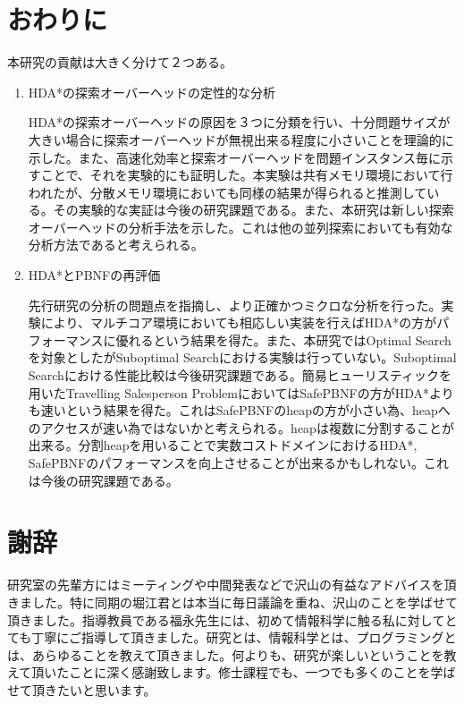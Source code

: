\documentclass[uplatex]{jsarticle}
\begin{document}
\section{おわりに}
\label{sec:conclusion}

本研究の貢献は大きく分けて２つある。

\begin{enumerate}
\item HDA*の探索オーバーヘッドの定性的な分析

HDA*の探索オーバーヘッドの原因を３つに分類を行い、十分問題サイズが大きい場合に探索オーバーヘッドが無視出来る程度に小さいことを理論的に示した。また、高速化効率と探索オーバーヘッドを問題インスタンス毎に示すことで、それを実験的にも証明した。本実験は共有メモリ環境において行われたが、分散メモリ環境においても同様の結果が得られると推測している。その実験的な実証は今後の研究課題である。また、本研究は新しい探索オーバーヘッドの分析手法を示した。これは他の並列探索においても有効な分析方法であると考えられる。
\newline

\item HDA*とPBNFの再評価

先行研究の分析の問題点を指摘し、より正確かつミクロな分析を行った。実験により、マルチコア環境においても相応しい実装を行えばHDA*の方がパフォーマンスに優れるという結果を得た。また、本研究ではOptimal Searchを対象としたがSuboptimal Searchにおける実験は行っていない。Suboptimal Searchにおける性能比較は今後研究課題である。簡易ヒューリスティックを用いたTravelling Salesperson ProblemにおいてはSafePBNFの方がHDA*よりも速いという結果を得た。これはSafePBNFのheapの方が小さい為、heapへのアクセスが速い為ではないかと考えられる。heapは複数に分割することが出来る。分割heapを用いることで実数コストドメインにおけるHDA*, SafePBNFのパフォーマンスを向上させることが出来るかもしれない。これは今後の研究課題である。

\end{enumerate}

\section{謝辞}

研究室の先輩方にはミーティングや中間発表などで沢山の有益なアドバイスを頂きました。特に同期の堀江君とは本当に毎日議論を重ね、沢山のことを学ばせて頂きました。指導教員である福永先生には、初めて情報科学に触る私に対してとても丁寧にご指導して頂きました。研究とは、情報科学とは、プログラミングとは、あらゆることを教えて頂きました。何よりも、研究が楽しいということを教えて頂いたことに深く感謝致します。修士課程でも、一つでも多くのことを学ばせて頂きたいと思います。

\newpage




\newpage

\printindex
\end{document}
